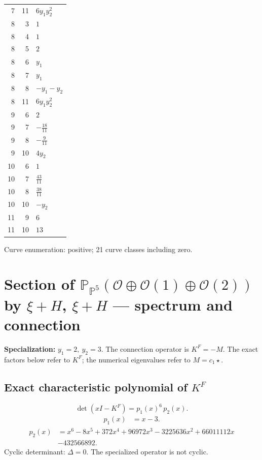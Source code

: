 \documentclass[10pt,a4paper]{article}
\begin{document}
{\begin{longtable}{rrp{125mm}}
7 & 11 & $6 y_{1} y_{2}^{2}$\\
8 & 3 & $1$\\
8 & 4 & $1$\\
8 & 5 & $2$\\
8 & 6 & $y_{1}$\\
8 & 7 & $y_{1}$\\
8 & 8 & $- y_{1} - y_{2}$\\
8 & 11 & $6 y_{1} y_{2}^{2}$\\
9 & 6 & $2$\\
9 & 7 & $- \frac{18}{11}$\\
9 & 8 & $- \frac{9}{11}$\\
9 & 10 & $4 y_{2}$\\
10 & 6 & $1$\\
10 & 7 & $\frac{43}{11}$\\
10 & 8 & $\frac{38}{11}$\\
10 & 10 & $- y_{2}$\\
11 & 9 & $6$\\
11 & 10 & $13$\\
\end{longtable}}
Curve enumeration: positive; 21 curve classes including zero.
\clearpage\section*{Section of $\mathbb P_{\mathbb P^{5}}(\mathcal O\oplus \mathcal O(1)\oplus \mathcal O(2))$ by $\xi +H$, $\xi +H$ --- spectrum and connection}
\textbf{Specialization:} $y_1=2,\ y_2=3$. The connection operator is $K^F=-M$. The exact factors below refer to $K^F$; the numerical eigenvalues refer to $M=c_1\star$.
\subsection*{Exact characteristic polynomial of $K^F$}
\[\det(xI-K^F)=p_{1}(x)^{6}\,p_{2}(x).\]
\[\begin{aligned}p_{1}(x)&=x - 3.\end{aligned}\]
\[\begin{aligned}p_{2}(x)&=x^{6} - 8 x^{5} + 372 x^{4} + 96972 x^{3} - 3225636 x^{2} + 66011112 x\\&-432566892.\end{aligned}\]
Cyclic determinant: $\Delta=0$. The specialized operator is not cyclic.
\end{document}
